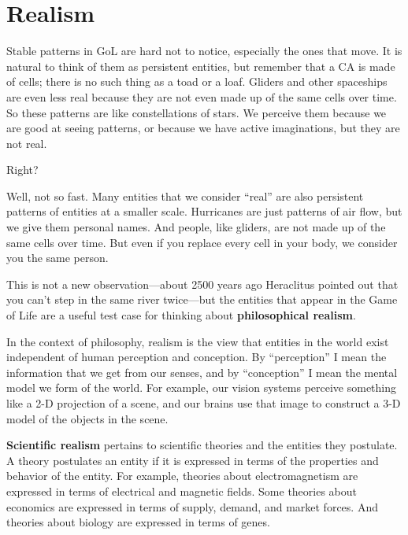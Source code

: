 \documentclass[12pt]{book}
\theoremstyle{exercise}
\begin{document}


\section{Realism}

Stable patterns in GoL are hard not to notice, especially the ones
that move.  It is natural to think of them as persistent entities, but
remember that a CA is made of cells; there is no such thing as a toad
or a loaf.  Gliders and other spaceships are even less real because
they are not even made up of the same cells over time.  So these
patterns are like constellations of stars.  We perceive them because
we are good at seeing patterns, or because we have active
imaginations, but they are not real.


Right?

Well, not so fast.  Many entities that we consider ``real'' are also
persistent patterns of entities at a smaller scale.  Hurricanes are
just patterns of air flow, but we give them personal names.  And
people, like gliders, are not made up of the same cells over time.
But even if you replace every cell in your body, we consider you the
same person.


This is not a new observation---about 2500 years ago Heraclitus
pointed out that you can't step in the same river twice---but the
entities that appear in the Game of Life are a useful test case for
thinking about {\bf philosophical realism}.


In the context of philosophy, realism is the view that entities
in the world exist independent of human perception and conception.
By ``perception'' I mean the information that we get from
our senses, and by ``conception'' I mean the mental model
we form of the world.  For example, our vision systems perceive
something like a 2-D projection of a scene, and our brains
use that image to construct a 3-D model of the objects in the
scene.


{\bf Scientific realism} pertains to scientific theories and the
entities they postulate.
A theory postulates an entity if it is
expressed in terms of the properties and behavior of the entity.  
For example, theories about electromagnetism are expressed in
terms of electrical and magnetic fields.  Some theories about economics
are expressed in terms of supply, demand, and market forces.
And theories about biology are expressed in terms of genes.
\end{document}
